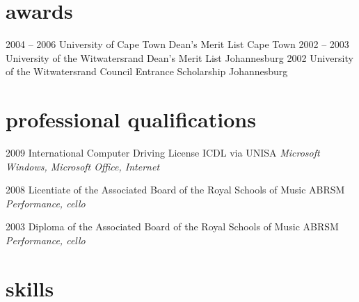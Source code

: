 \documentclass[]{friggeri-cv} %
\begin{document}
\section{awards}

\begin{entrylist}
\entry
{2004 -- 2006}
{University of Cape Town Dean's Merit List}
{Cape Town}
{}
\entry
{2002 -- 2003}
{University of the Witwatersrand Dean's Merit List}
{Johannesburg}
{}
\entry
{2002}
{University of the Witwatersrand Council Entrance Scholarship}
{Johannesburg}
{}
\end{entrylist}


\section{professional qualifications}

\begin{entrylist}
\entry
{2009}
{International Computer Driving License}
{ICDL via UNISA}
{\emph{Microsoft Windows, Microsoft Office, Internet}}

\entry
{2008}
{Licentiate of the Associated Board of the Royal Schools of Music}
{ABRSM}
{\emph{Performance, cello}}

\entry
{2003}
{Diploma of the Associated Board of the Royal Schools of Music}
{ABRSM}
{\emph{Performance, cello}}

\end{entrylist}


\section{skills}
\end{document}
